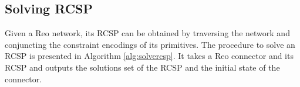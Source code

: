 \subsection{Solving RCSP}
Given a Reo  network, its RCSP can be obtained by traversing the network and conjuncting the constraint encodings of its primitives. 
%
%
%
%
%
 The procedure to solve an RCSP is presented in Algorithm \ref{alg:solvercsp}. It takes a Reo connector and its RCSP and outputs the solutions set of the RCSP and the initial state of the connector. %

